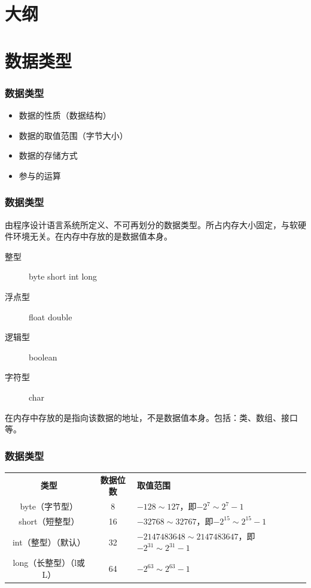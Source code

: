 \section*{大纲}

\section{数据类型}

\begin{frame}[fragile] %
  \frametitle{数据类型}

  \begin{itemize}
  \item 数据的性质（数据结构）
  \item 数据的取值范围（字节大小）
  \item 数据的存储方式
  \item 参与的运算
  \end{itemize}
  

\end{frame}

\begin{frame}[fragile] %
\frametitle{数据类型}

由程序设计语言系统所定义、不可再划分的数据类型。所占内存大小固定，与软硬件环境无关。在内存中存放的是数据值本身。

\begin{description}
\item[整型] byte short int long
\item[浮点型] float double
\item[逻辑型] boolean
\item[字符型] char
\end{description}


在内存中存放的是指向该数据的地址，不是数据值本身。包括：类、数组、接口等。
\end{frame}

\begin{frame}[fragile]
  \frametitle{数据类型}
  
  \begin{table}
    \footnotesize
    \setlength{\extrarowheight}{1.2mm}
    \begin{tabular}{c|c|p{5cm}}
      {\bf 类型} & {\bf 数据位数} & {\bf 取值范围}   \\
      byte（字节型） & 8 & $-128 \sim 127$，即$-2^{7} \sim 2^{7}-1$\\
      short（短整型） & 16 & $-32768 \sim 32767$，即$-2^{15} \sim 2^{15}-1$\\
      int（整型）（默认） & 32 & $-2147483648 \sim 2147483647$，即$-2^{31} \sim 2^{31}-1$\\
      long（长整型）（l或L） & 64 & $-2^{63} \sim 2^{63}-1$\\
    \end{tabular}
  \end{table}
\end{frame}

